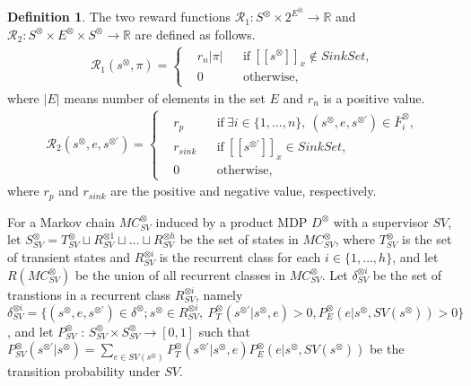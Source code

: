 \documentclass[10pt]{article}
\theoremstyle{definition}
\newtheorem{definition}{Definition}
\newcommand{\myspq}{\ensuremath{[\![s^{\otimes}]\!]}_x}
\newcommand{\myspdq}{\ensuremath{[\![s^{\otimes \prime}]\!]}_x}
\begin{document}
\begin{definition}
  The two reward functions $\mathcal{R}_1 : S^{\otimes} \times 2^{E^{\otimes}} \rightarrow \mathbb{R}$ and $\mathcal{R}_2 : S^{\otimes} \times E^{\otimes} \times S^{\otimes} \rightarrow \mathbb{R}$ are defined as follows.
  \begin{align}
    \mathcal{R}_1 (s^{\otimes}, \pi) =
    \left\{
    \begin{aligned}
      & r_{n}|\pi| & &\text{if} \ \myspq \notin SinkSet , \\
      & 0 & &\text{otherwise},
    \end{aligned}
    \right.
  \end{align}
  where $|E|$ means number of elements in the set $E$ and $r_{n}$ is a positive value.
  \begin{align}
    \mathcal{R}_2(s^{\otimes}, e, s^{\otimes \prime}) =
    \left\{
    \begin{aligned}
      &r_p & & \text{if}\ \exists i \in \! \{ 1, \ldots ,n \},\ (s^{\otimes}, e, s^{\otimes \prime}) \in \bar{F}^{\otimes}_i \!,\\
      &r_{sink} & & \text{if}\ \myspdq \in SinkSet,\\
      &0 & & \text{otherwise},
    \end{aligned}
    \right.
  \end{align}
  where $r_p$ and $r_{sink}$ are the positive and negative value, respectively.
  \label{reward_def}
\end{definition}

For a Markov chain $MC^{\otimes}_{SV}$ induced by a product MDP $D^{\otimes}$ with a supervisor $SV$, let $S^{\otimes}_{SV}= T^{\otimes}_{SV} \sqcup R^{\otimes 1}_{SV} \sqcup \ldots \sqcup R^{\otimes h}_{SV}$ be the set of states in $MC^{\otimes}_{SV}$, where $T^{\otimes}_{SV}$ is the set of transient states and $R^{\otimes i}_{SV}$ is the recurrent class for each $i \in \{ 1, \ldots ,h \}$, and let $R(MC^{\otimes}_{SV})$ be the union of all recurrent classes in $MC^{\otimes}_{SV}$. Let $\delta^{\otimes i}_{SV}$ be the set of transtions in a recurrent class $R^{\otimes i}_{SV}$, namely $\delta^{\otimes i}_{SV} = \{ (s^{\otimes}, e, s^{\otimes \prime}) \in \delta^{\otimes} ; s^{\otimes} \in R^{\otimes i}_{SV},\ P^{\otimes}_T(s^{\otimes \prime}|s^{\otimes}, e) > 0, P^{\otimes}_E(e | s^{\otimes}, SV(s^{\otimes})) > 0 \}$, and let $P^{\otimes}_{SV}$ : $S^{\otimes}_{SV} \times S^{\otimes}_{SV} \rightarrow [0,1]$ such that $P^{\otimes}_{SV} (s^{\otimes \prime} | s^{\otimes}) = \sum_{e \in SV(s^{\otimes})} P^{\otimes}_T (s^{\otimes \prime} | s^{\otimes}, e) P^{\otimes}_E (e | s^{\otimes}, SV(s^{\otimes}))$ be the transition probability under $SV$.
\end{document}
